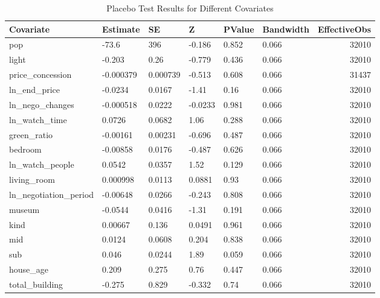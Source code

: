 \begin{table}[ht]
\centering
\caption{Placebo Test Results for Different Covariates} 
\label{tab:placebo_test_results}
\begin{tabular}{llllllr}
  \hline
Covariate & Estimate & SE & Z & PValue & Bandwidth & EffectiveObs \\ 
  \hline
pop & -73.6 & 396 & -0.186 & 0.852 & 0.066 & 32010 \\ 
  light & -0.203 & 0.26 & -0.779 & 0.436 & 0.066 & 32010 \\ 
  price\_concession & -0.000379 & 0.000739 & -0.513 & 0.608 & 0.066 & 31437 \\ 
  ln\_end\_price & -0.0234 & 0.0167 & -1.41 & 0.16 & 0.066 & 32010 \\ 
  ln\_nego\_changes & -0.000518 & 0.0222 & -0.0233 & 0.981 & 0.066 & 32010 \\ 
  ln\_watch\_time & 0.0726 & 0.0682 & 1.06 & 0.288 & 0.066 & 32010 \\ 
  green\_ratio & -0.00161 & 0.00231 & -0.696 & 0.487 & 0.066 & 32010 \\ 
  bedroom & -0.00858 & 0.0176 & -0.487 & 0.626 & 0.066 & 32010 \\ 
  ln\_watch\_people & 0.0542 & 0.0357 & 1.52 & 0.129 & 0.066 & 32010 \\ 
  living\_room & 0.000998 & 0.0113 & 0.0881 & 0.93 & 0.066 & 32010 \\ 
  ln\_negotiation\_period & -0.00648 & 0.0266 & -0.243 & 0.808 & 0.066 & 32010 \\ 
  museum & -0.0544 & 0.0416 & -1.31 & 0.191 & 0.066 & 32010 \\ 
  kind & 0.00667 & 0.136 & 0.0491 & 0.961 & 0.066 & 32010 \\ 
  mid & 0.0124 & 0.0608 & 0.204 & 0.838 & 0.066 & 32010 \\ 
  sub & 0.046 & 0.0244 & 1.89 & 0.059 & 0.066 & 32010 \\ 
  house\_age & 0.209 & 0.275 & 0.76 & 0.447 & 0.066 & 32010 \\ 
  total\_building & -0.275 & 0.829 & -0.332 & 0.74 & 0.066 & 32010 \\ 
   \hline
\end{tabular}
\end{table}

